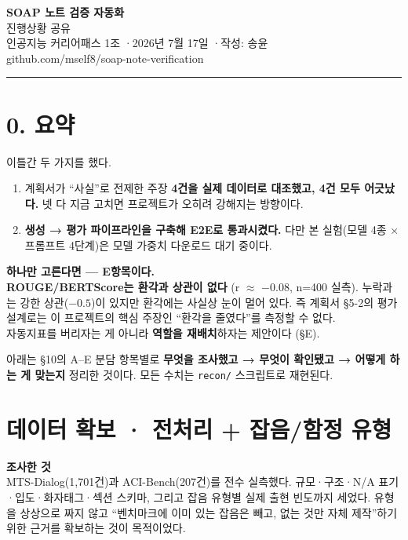 \documentclass[10.5pt,a4paper]{article}
\newcommand{\investigated}[1]{%
\begin{tcolorbox}[enhanced, blank, breakable,
  borderline west={2.2pt}{0pt}{rulegray},
  left=10pt, right=0pt, top=2pt, bottom=2pt, before skip=6pt, after skip=10pt]
{\footnotesize\bfseries\color{navy}조사한 것}\\[2pt]#1
\end{tcolorbox}}
\newcommand{\keybox}[1]{%
\begin{tcolorbox}[enhanced, breakable, colback=white, boxrule=1pt, colframe=accent, arc=1pt,
  left=11pt, right=10pt, top=8pt, bottom=8pt, before skip=12pt, after skip=8pt,
  before upper={\setlength{\parskip}{0.6em}\setlength{\parindent}{0pt}}]
#1
\end{tcolorbox}}
\newcommand{\hl}[1]{\textbf{\color{accent}#1}}
\begin{document}
\thispagestyle{fancy}
\begin{center}
{\LARGE\bfseries\color{navy} SOAP 노트 검증 자동화}\\[5pt]
{\large\color{navy} 진행상황 공유}\\[10pt]
{\small 인공지능 커리어패스 1조 \quad·\quad 2026년 7월 17일 \quad·\quad 작성: 송윤}\\[3pt]
{\footnotesize\ttfamily github.com/mself8/soap-note-verification}
\end{center}
\vspace{0.3em}
{\color{navy}\rule{\linewidth}{1pt}}
\vspace{0.8em}

\section*{\color{navy}0. 요약}

이틀간 두 가지를 했다.

\begin{enumerate}
\item 계획서가 ``사실''로 전제한 주장 \textbf{4건을 실제 데이터로 대조했고, 4건 모두 어긋났다.} 넷 다 지금 고치면 프로젝트가 오히려 강해지는 방향이다.
\item \textbf{생성 → 평가 파이프라인을 구축해 E2E로 통과시켰다.} 다만 본 실험(모델 4종 × 프롬프트 4단계)은 모델 가중치 다운로드 대기 중이다.
\end{enumerate}

\keybox{
{\bfseries 하나만 고른다면 — E항목이다.}\\[4pt]
\hl{ROUGE/BERTScore는 환각과 상관이 없다} (r $\approx$ $-0.08$, n=400 실측). 누락과는 강한 상관($-0.5$)이 있지만 환각에는 사실상 눈이 멀어 있다. 즉 계획서 §5-2의 평가 설계로는 이 프로젝트의 핵심 주장인 ``환각을 줄였다''를 측정할 수 없다.\\[4pt]
자동지표를 버리자는 게 아니라 \textbf{역할을 재배치}하자는 제안이다 (§E).
}

아래는 §10의 A--E 분담 항목별로 \textbf{무엇을 조사했고 → 무엇이 확인됐고 → 어떻게 하는 게 맞는지} 정리한 것이다. 모든 수치는 \texttt{recon/} 스크립트로 재현된다.

\section{데이터 확보 · 전처리 + 잡음/함정 유형}

\investigated{MTS-Dialog(1,701건)과 ACI-Bench(207건)를 전수 실측했다. 규모·구조·N/A 표기·입도·화자태그·섹션 스키마, 그리고 잡음 유형별 실제 출현 빈도까지 세었다. 유형을 상상으로 짜지 않고 ``벤치마크에 이미 있는 잡음은 빼고, 없는 것만 자체 제작''하기 위한 근거를 확보하는 것이 목적이었다.}
\end{document}
